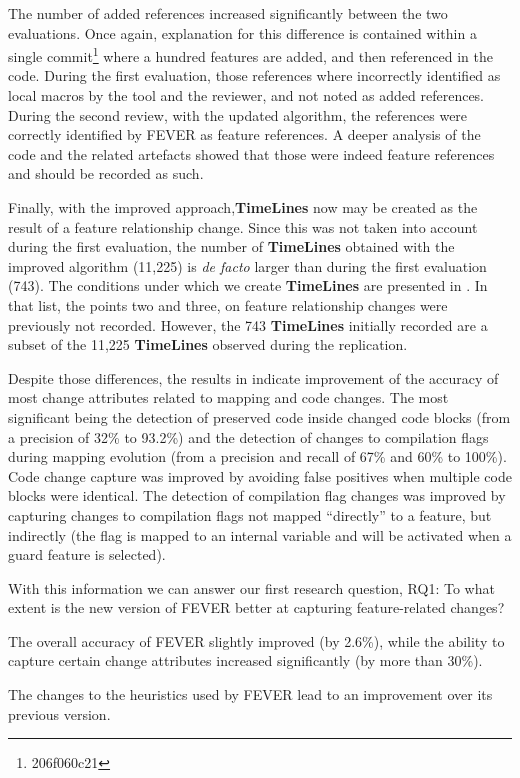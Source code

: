 The number of added references increased significantly between the two evaluations.
Once again, explanation for this difference is contained within a single commit\footnote{206f060c21} where
a hundred features are added, and then referenced in the code. During the first evaluation, 
those references where incorrectly identified as local macros by the tool and the reviewer, and not noted as added references.
During the second review, with the updated algorithm, the references were correctly identified by FEVER as feature references.
A deeper analysis of the code and the related artefacts showed that those were indeed feature references
and should be recorded as such.

Finally, with the improved approach,\textbf{TimeLines} now may be created as the result of a feature relationship change.
Since this was not taken into account during the first evaluation, the number of \textbf{TimeLines} obtained with the improved algorithm (11,225)
is \textit{de facto} larger than during the first evaluation (743).
The conditions under which we create \textbf{TimeLines} are presented in . In that list, the points two and three, on
feature relationship changes were previously not recorded. However, the 743 \textbf{TimeLines} initially recorded are a subset of the 11,225 
\textbf{TimeLines} observed during the replication.

Despite those differences, the results in  indicate improvement of the
accuracy of most change attributes related to mapping and code changes.
The most significant being the detection of preserved code inside changed code blocks (from a precision of 32\% to 93.2\%)
and the detection of changes to compilation flags during mapping evolution (from a precision and recall of 67\% and 60\% to 100\%).
Code change capture was improved by avoiding false positives when multiple code blocks were identical.
The detection of compilation flag changes was improved by capturing changes to compilation flags not mapped ``directly'' to a feature, but indirectly (the flag is mapped to an internal variable and will be activated when a guard feature is selected).

With this information we can answer our first research question, RQ1: To what extent is the new version of FEVER better at capturing feature-related changes?
\begin{framed}
The overall accuracy of FEVER slightly improved (by 2.6\%), while the ability to 
capture certain change attributes increased significantly (by more than 30\%).

The changes to the heuristics used by FEVER lead to an improvement over its previous version.
\end{framed}

